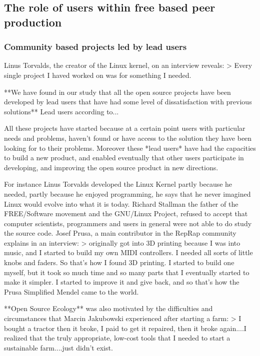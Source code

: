 \documentclass{ICED-Paper}%
\begin{document}
\subsection{The role of users within free based peer production}
\subsubsection{Community based projects led by lead users}

Linus Torvalds, the creator of the Linux kernel, on an interview reveals:
> Every single project I haved worked on was for something I needed.

**We have found in our study that all the open source projects have been developed by lead users that have had some level of dissatisfaction with previous solutions** Lead users according to...

All these projects have started because at a certain point users with particular needs and problems, haven't found or have access to the solution they have been looking for to their problems. Moreover these *lead users* have had the capacities to build a new product, and enabled eventually that other users participate in developing, and improving the open source product in new directions.

For instance Linus Torvalds developed the Linux Kernel partly because he needed, partly because he enjoyed programming, he says that he never imagined Linux would evolve into what it is today. Richard Stallman the father of the FREE/Software movement and the GNU/Linux Project, refused to accept that computer scientists, programmers and users in general were not able to do study the source code.
Josef Prusa, a main contributor in the RepRap community explains in an interview:
>  originally got into 3D printing because I was into music, and I started to build my own MIDI controllers. I needed all sorts of little knobs and faders. So that’s how I found 3D printing. I started to build one myself, but it took so much time and so many parts that I eventually started to make it simpler. I started to improve it and give back, and so that’s how the Prusa Simplified Mendel came to the world.

**Open Source Ecology** was also motivated by the difficulties and circumstances that Marcin Jakubowski experienced after starting a farm:
> I bought a tractor then it broke, I paid to get it repaired, then it broke again....I realized that the truly appropriate, low-cost tools that I needed to start a sustainable farm....just didn't exist.
\end{document}
